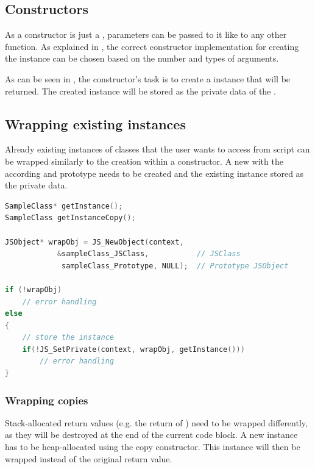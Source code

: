 \subsection{Constructors}

As a constructor is just a , parameters can be passed to it like to any other function. As explained in , the correct constructor implementation for creating the  instance can be chosen based on the number and types of arguments.

As can be seen in , the constructor's task is to create a  instance that will be returned. The created  instance will be stored as the private data of the .

\subsection{Wrapping existing instances}

Already existing instances of  classes that the user wants to access from script can be wrapped similarly to the creation within a constructor. A new  with the according  and prototype needs to be created and the existing instance stored as the private data.

\SingleSpacing
\begin{lstlisting}[language=C++, caption=Wrapping an instance]
SampleClass* getInstance();
SampleClass getInstanceCopy();

JSObject* wrapObj = JS_NewObject(context, 
			&sampleClass_JSClass,           // JSClass
			 sampleClass_Prototype, NULL);  // Prototype JSObject
			 
if (!wrapObj)
	// error handling
else
{
	// store the instance
	if(!JS_SetPrivate(context, wrapObj, getInstance()))
		// error handling
}

\end{lstlisting}
\OnehalfSpacing

\subsubsection{Wrapping copies}
\label{sec:WrappingCopies}

Stack-allocated return values (e.g. the return of ) need to be wrapped differently, as they will be destroyed at the end of the current code block. A new instance has to be heap-allocated using the copy constructor. This instance will then be wrapped instead of the original return value.

